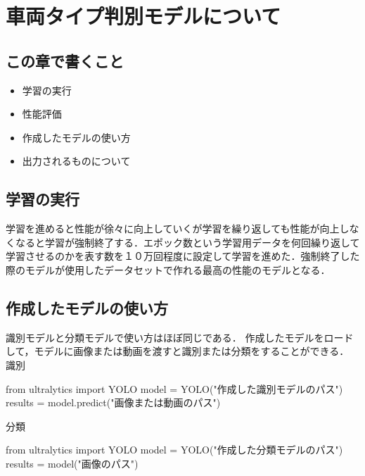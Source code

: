 

\chapter{車両タイプ判別モデルについて}
\section{この章で書くこと}
\begin{itemize}
	\item 学習の実行
	\item 性能評価
	\item 作成したモデルの使い方
	\item 出力されるものについて
\end{itemize}


\section{学習の実行}
学習を進めると性能が徐々に向上していくが学習を繰り返しても性能が向上しなくなると学習が強制終了する．エポック数という学習用データを何回繰り返して学習させるのかを表す数を１０万回程度に設定して学習を進めた．強制終了した際のモデルが使用したデータセットで作れる最高の性能のモデルとなる．

\section{作成したモデルの使い方}
識別モデルと分類モデルで使い方はほぼ同じである．
作成したモデルをロードして，モデルに画像または動画を渡すと識別または分類をすることができる．\\
識別
\begin{verbatimx}
	from ultralytics import YOLO
	model = YOLO("作成した識別モデルのパス")
	results = model.predict("画像または動画のパス")
\end{verbatimx}

分類
\begin{verbatimx}
	from ultralytics import YOLO
	model = YOLO("作成した分類モデルのパス")
	results = model("画像のパス")
\end{verbatimx}


